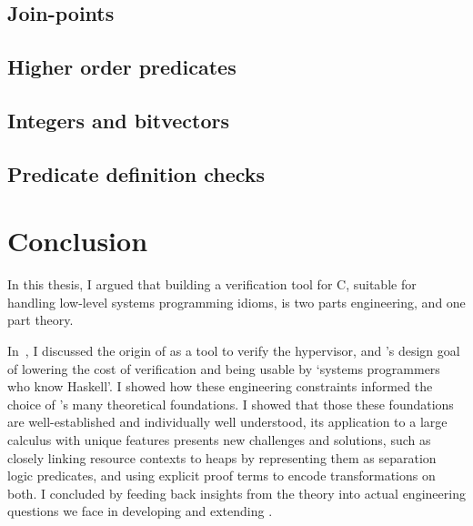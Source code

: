 \section{Join-points}

\section{Higher order predicates}

\section{Integers and bitvectors}

\section{Predicate definition checks}

\chapter{Conclusion}%
\label{chap:conclusion}

\margintoc{}

In this thesis, I argued that building a verification tool for C, suitable
for handling low-level systems programming idioms, is two parts engineering,
and one part theory.

In~, I discussed the origin of  as a tool
to verify the  hypervisor, and 's design goal of lowering the
cost of verification and being usable by `systems programmers who know
Haskell'. I showed how these engineering constraints informed the choice of
's many theoretical foundations. I showed that those these foundations
are well-established and individually well understood, its application to a
large calculus  with unique features presents new challenges and
solutions, such as closely linking resource contexts to heaps by representing
them as separation logic predicates, and using explicit proof terms to encode
transformations on both. I concluded by feeding back insights from the theory
into actual engineering questions we face in developing and extending .

